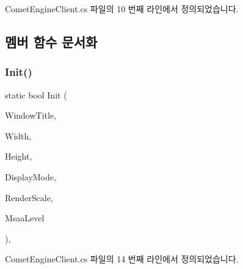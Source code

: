 Comet\+Engine\+Client.\+cs 파일의 10 번째 라인에서 정의되었습니다.



\subsection{멤버 함수 문서화}
\mbox{\label{class_comet_engine_1_1_client_1_1_comet_engine_client_af5f8db49a5de5bb41cf935066d21f5aa}} 
\subsubsection{\texorpdfstring{Init()}{Init()}}
{\footnotesize\ttfamily static bool Init (\begin{DoxyParamCaption}\item[{string}]{Window\+Title,  }\item[{int}]{Width,  }\item[{int}]{Height,  }\item[{\hyperlink{namespace_comet_engine_1_1_client_a608d2e459fd95babca189e50f4182a65}{W\+Indow\+Modes}}]{Display\+Mode,  }\item[{int}]{Render\+Scale,  }\item[{int}]{Msaa\+Level }\end{DoxyParamCaption})\hspace{0.3cm}{\ttfamily [inline]}, {\ttfamily [static]}}



Comet\+Engine\+Client.\+cs 파일의 14 번째 라인에서 정의되었습니다.


